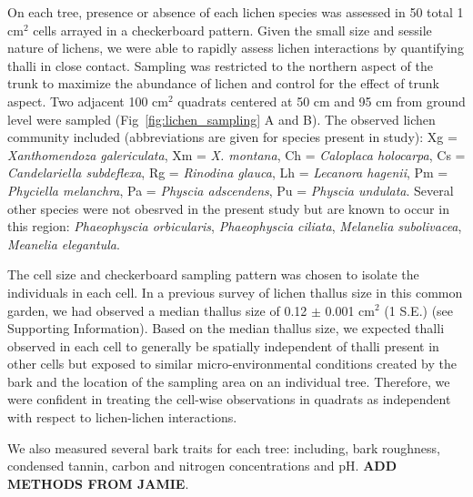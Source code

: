 \documentclass[11pt,twocolumn,twoside,lineno]{pnas-new}
\begin{document}
{On each tree, presence or absence of each lichen species was assessed
in 50 total 1 cm$^2$ cells arrayed in a checkerboard pattern. Given
the small size and sessile nature of lichens, we were able to rapidly
assess lichen interactions by quantifying thalli in close
contact. Sampling was restricted to the northern aspect of the trunk
to maximize the abundance of lichen and control for the effect of
trunk aspect. Two adjacent 100 cm$^2$ quadrats centered at 50 cm and
95 cm from ground level were sampled (Fig~\ref{fig:lichen_sampling} A
and B). The observed lichen community included (abbreviations are
given for species present in study): Xg = \textit{Xanthomendoza
  galericulata}, Xm = \textit{X. montana}, Ch = \textit{Caloplaca
  holocarpa}, Cs = \textit{Candelariella subdeflexa}, Rg =
\textit{Rinodina glauca}, Lh = \textit{Lecanora hagenii}, Pm =
\textit{Phyciella melanchra}, Pa = \textit{Physcia adscendens}, Pu =
\textit{Physcia undulata}. Several other species were not obesrved in
the present study but are known to occur in this region:
\textit{Phaeophyscia orbicularis}, \textit{Phaeophyscia ciliata},
\textit{Melanelia subolivacea}, \textit{Meanelia elegantula}.


The cell size and checkerboard sampling pattern was chosen to isolate
the individuals in each cell. In a previous survey of lichen thallus
size in this common garden, we had observed a median thallus size of
0.12 $\pm$ 0.001 cm$^2$ (1 S.E.) (see Supporting Information). Based
on the median thallus size, we expected thalli observed in each cell
to generally be spatially independent of thalli present in other cells
but exposed to similar micro-environmental conditions created by the
bark and the location of the sampling area on an individual
tree. Therefore, we were confident in treating the cell-wise
observations in quadrats as independent with respect to lichen-lichen
interactions.



We also measured several bark traits for each tree: including, bark
roughness, condensed tannin, carbon and nitrogen concentrations and
pH. \textbf{ADD METHODS FROM JAMIE}.


}
\end{document}
